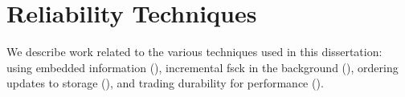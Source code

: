\section{Reliability Techniques}
\label{sec-related-tech}

We describe work related to the various techniques used in this
dissertation: using embedded information
(), incremental fsck in the background
(), ordering updates to storage
(), and trading durability for performance
().



 

